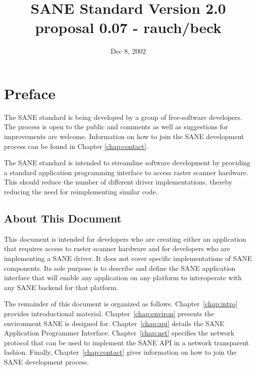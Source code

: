 \documentclass[11pt,DVIps]{report}
\title{\huge SANE Standard Version 2.0 proposal 0.07 - rauch/beck}
\author{}
\date{Dec 8, 2002}
\begin{document}
\newcommand{\filename}[1]{{\tt #1}}
\newcommand{\code}[1]{{\tt #1}}
\newcommand{\var}[1]{{\it #1}}
\newcommand{\defn}[1]{#1\index{#1}}

\begin{latexonly}
  \setcounter{changebargrey}{0}   %
\end{latexonly}

\maketitle
\tableofcontents
\listoffigures
\listoftables


\chapter{Preface}

The SANE standard is being developed by a group of free-software
developers.  The process is open to the public and comments as well as
suggestions for improvements are welcome.  Information on how to join
the SANE development process can be found in Chapter
\ref{chap:contact}.

The SANE standard is intended to streamline software development by
providing a standard application programming interface to access
raster scanner hardware.  This should reduce the number of different
driver implementations, thereby reducing the need for reimplementing
similar code.


\section{About This Document}

This document is intended for developers who are creating either an
application that requires access to raster scanner hardware and for
developers who are implementing a SANE driver.  It does not cover
specific implementations of SANE components.  Its sole purpose is to
describe and define the SANE application interface that will enable
any application on any platform to interoperate with any SANE backend
for that platform.

The remainder of this document is organized as follows.
Chapter~\ref{chap:intro} provides introductional material.
Chapter~\ref{chap:environ} presents the environment SANE is designed
for.  Chapter~\ref{chap:api} details the SANE Application Programmer
Interface.  Chapter~\ref{chap:net} specifies the network protocol that
can be used to implement the SANE API in a network transparent
fashion.  Finally, Chapter~\ref{chap:contact} gives information on how
to join the SANE development process.
\end{document}
